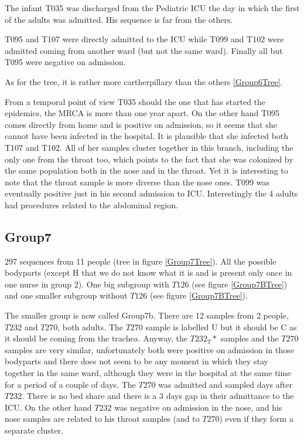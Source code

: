 \documentclass[12pt,a4paper]{article}
\begin{document}
The infant T035 was discharged from the Pediatric ICU the day in which the first of the adults was admitted. His  sequence is far from the others. 

T095 and T107 were directly admitted to the ICU while T099 and T102 were admitted coming from another ward (but not the same ward). Finally all but T095 were negative on admission. 

As for the tree, it is rather more cartherpillary than the others \ref{Group6Tree}.

From a temporal point of view T035 should the one that has started the epidemics, the MRCA is more than one year apart. On the other hand T095 comes directly from home and is positive on admission, so it seems that she cannot have been infected in  the hospital. It is plausible that she infected both T107 and T102. All of her samples cluster together in this branch, including the only one from the throat too, which points to the fact that she was colonized by the same population both in the nose and in the throat. Yet it is interesting to note that the throat sample is more diverse than the nose ones. T099 was eventually positive just in his second admission to ICU. 
Interestingly the 4 adults had procedures related to the abdominal region.

\subsection{Group7}
297 sequences from 11 people (tree in figure \ref{Group7Tree}). All the possible bodyparts (except H that we do not know what it is and is present only once in one nurse in group 2). One big subgroup with $T126$ (see figure \ref{Group7BTree}) and one smaller subgroup without $T126$ (see figure \ref{Group7BTree}).

The smaller group is now called Group7b. There are 12 samples from 2 people, $T232$ and $T270$, both adults.
The $T270$ sample is labelled U but it should be C as it should be coming from the trachea.
Anyway, the $T232_T*$ samples and the $T270$ samples are very similar, unfortunately both were positive on admission in those bodyparts and there does not seem to be any moment in which they stay together in the same ward, although they were in the hospital at the same time for a period of a couple of days. The $T270$ was admitted and sampled days after $T232$. There is no bed share and there is a 3 days gap in their admittance to the ICU.
On the other hand $T232$ was negative on admission in the nose, and his nose samples are related to his throat samples (and to $T270$) even if they form a separate cluster.
\end{document}
